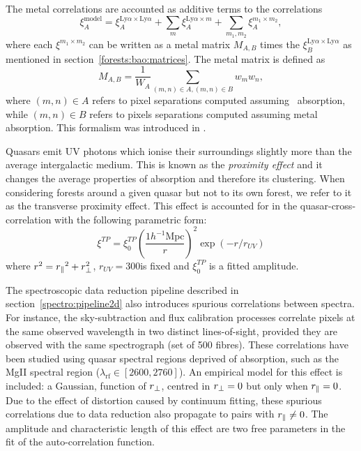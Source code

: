 The metal correlations are accounted as additive terms to the \lya 
correlations
\begin{equation}
\xi^\mathrm{model}_A =    \xi^{\mathrm{Ly}\alpha \times \mathrm{Ly}\alpha  }_A 
    + \sum_m \xi^{\mathrm{Ly}\alpha  \times m}_A
    + \sum_{m_1, m_2} \xi^{m_1 \times m_2}_A,
\end{equation}
where each $\xi^{m_1 \times m_2}$ can be written as a metal matrix 
$M_{A,B}$ times the $\xi^{\mathrm{Ly}\alpha \times \mathrm{Ly}\alpha  }_B$ 
as mentioned in section~\ref{forests:bao:matrices}. The metal matrix is 
defined as 
\begin{equation}
M_{A,B} = \frac{1}{W_A}  \sum_{(m,n)\in A, (m, n)\in B} w_m w_n, 
\end{equation}
where $(m, n)\in A$ refers to pixel separations computed assuming 
\lya\ absorption, while $(m, n)\in B$ refers to pixels separations  
computed assuming metal absorption. This formalism was introduced 
in \cite{blomqvistTriplyionizedCarbonForest2018}. 

Quasars emit UV photons which ionise their surroundings slightly 
more than the average intergalactic medium. This is known as the 
\emph{proximity effect} and it changes the average properties of 
\lya absorption and therefore its clustering. When considering 
forests around a given quasar but not to its own forest, we refer 
to it as the transverse proximity effect. This effect is accounted  
for in the quasar-\lya cross-correlation with the following parametric
form:
\begin{equation}
\xi^{TP} = \xi_0^{TP} \left( \frac{1 h^{-1} \mathrm{Mpc}}{r} \right)^2 \exp \left( - r /r_{UV} \right)
\end{equation}
where $r^2 = {r_\parallel}^2 + r^2_\perp$, $r_{UV} = 300$\hmpc is fixed and $\xi_0^{TP}$ 
is a fitted amplitude. 

The spectroscopic data reduction pipeline described in section~\ref{spectro:pipeline2d}
also introduces spurious correlations between spectra. 
For instance, the sky-subtraction and flux calibration processes 
correlate pixels at the same observed wavelength in two distinct lines-of-sight, 
provided they are observed with the same spectrograph (set of 500 fibres). 
These correlations have been studied using quasar spectral regions deprived of \lya absorption,
such as the MgII spectral region ($\lambda_\mathrm{rf} \in [2600, 2760]$\angstrom).
An empirical model for this effect is included: 
a Gaussian, function of ${r_\perp}$, centred in ${r_\perp} = 0$ but only when ${r_\parallel} = 0$. 
Due to the effect of distortion caused by continuum fitting, these spurious
correlations due to data reduction also propagate to pairs with ${r_\parallel} \neq 0$.  
The amplitude and characteristic length of this effect are two free parameters
in the fit of the \lya auto-correlation function.

